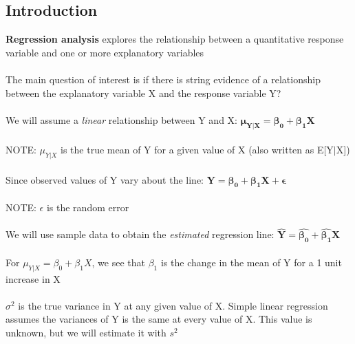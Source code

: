 \documentclass[12pt, a4paper]{article}
\begin{document}
	\subsection{Introduction}
	\textbf{Regression analysis} explores the relationship between a quantitative response variable and one or more explanatory variables \\~\\
	The main question of interest is if there is string evidence of a relationship between the explanatory variable X and the response variable Y? \\~\\
	We will assume a \textit{linear} relationship between Y and X: $\bm{\mu_{Y|X} = \beta_0 + \beta_1X}$ \\~\\
	NOTE: $\mu_{Y|X}$ is the true mean of Y for a given value of X (also written as E[Y$|$X]) \\~\\
	Since observed values of Y vary about the line: $\bm{Y = \beta_0 + \beta_1X + \epsilon}$ \\~\\ NOTE: $\epsilon$ is the random error \\~\\
	We will use sample data to obtain the \textit{estimated} regression line: $\bm{\hat{Y} = \hat{\beta_0}+\hat{\beta_1}X}$ \\~\\
	For $\mu_{Y|X} = \beta_0 + \beta_1X$, we see that $\beta_1$ is the change in the mean of Y for a 1 unit increase in X \\~\\
	$\sigma^2$ is the true variance in Y at any given value of X. Simple linear regression assumes the variances of Y is the same at every value of X. This value is unknown, but we will estimate it with $s^2$  \\~\\
	
\end{document}
